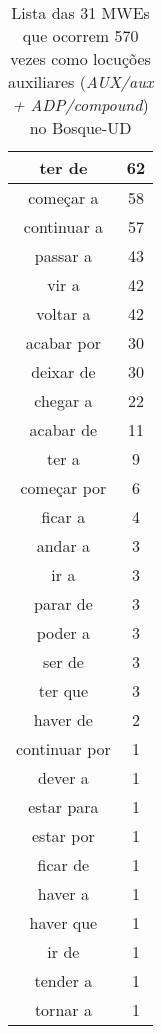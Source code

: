 \documentclass[output=paper,colorlinks,citecolor=brown]{langscibook}
\begin{document}
\begin{table}[]
{\begin{tabular}{|c|c|}
				ter de & 62\\\hline
				começar a & 58\\\hline
				continuar a & 57\\\hline
				passar a & 43\\\hline
				vir a & 42\\\hline
				voltar a & 42\\\hline
				acabar por & 30\\\hline
				deixar de & 30\\\hline
				chegar a & 22\\\hline
				acabar de & 11\\\hline
				ter a & 9\\\hline
				começar por & 6\\\hline
				ficar a & 4\\\hline
				andar a & 3\\\hline
				ir a & 3\\\hline
				parar de & 3\\\hline
				poder a & 3\\\hline
				ser de & 3\\\hline
				ter que & 3\\\hline
				haver de & 2\\\hline
				continuar por & 1\\\hline
				dever a & 1\\\hline
				estar para & 1\\\hline
				estar por & 1\\\hline
				ficar de & 1\\\hline
				haver a & 1\\\hline
				haver que & 1\\\hline
				ir de & 1\\\hline
				tender a & 1\\\hline
				tornar a & 1\\\hline
			\end{tabular}
		}
		\caption{Lista das 31 MWEs que ocorrem 570 vezes como locuções auxiliares (\emph{AUX/aux + ADP/compound}) no Bosque-UD}
		\label{tab:auxphrasalverb}
	\end{table}
\end{document}
